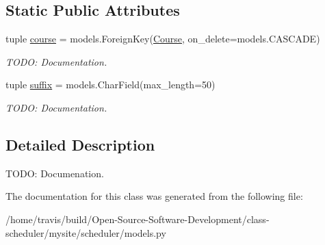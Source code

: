 \subsection*{Static Public Attributes}
\begin{DoxyCompactItemize}
\item 
\hypertarget{classscheduler_1_1models_1_1_pregen_section_a3eafd0071b89cf3573c5f47c9194f848}{tuple \hyperlink{classscheduler_1_1models_1_1_pregen_section_a3eafd0071b89cf3573c5f47c9194f848}{course} = models.\-Foreign\-Key(\hyperlink{classscheduler_1_1models_1_1_course}{Course}, on\-\_\-delete=models.\-C\-A\-S\-C\-A\-D\-E)}\label{classscheduler_1_1models_1_1_pregen_section_a3eafd0071b89cf3573c5f47c9194f848}

\begin{DoxyCompactList}\small\item\em T\-O\-D\-O\-: Documentation. \end{DoxyCompactList}\item 
\hypertarget{classscheduler_1_1models_1_1_pregen_section_ae51c6af4b08756b861dc5fe9bec2e203}{tuple \hyperlink{classscheduler_1_1models_1_1_pregen_section_ae51c6af4b08756b861dc5fe9bec2e203}{suffix} = models.\-Char\-Field(max\-\_\-length=50)}\label{classscheduler_1_1models_1_1_pregen_section_ae51c6af4b08756b861dc5fe9bec2e203}

\begin{DoxyCompactList}\small\item\em T\-O\-D\-O\-: Documentation. \end{DoxyCompactList}\end{DoxyCompactItemize}


\subsection{Detailed Description}
T\-O\-D\-O\-: Documenation. 

The documentation for this class was generated from the following file\-:\begin{DoxyCompactItemize}
\item 
/home/travis/build/\-Open-\/\-Source-\/\-Software-\/\-Development/class-\/scheduler/mysite/scheduler/models.\-py\end{DoxyCompactItemize}
